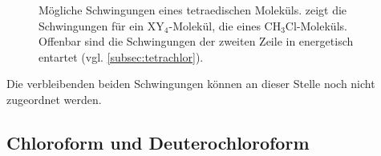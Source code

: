 \documentclass[../bericht.tex]{subfiles}
\begin{document}
\begin{figure}[p]
{            \label{fig:chcl3-schwingungen}}
          \caption[Mögliche Schwingungen eines tetraedischen Moleküls.]{Mögliche Schwingungen eines tetraedischen Moleküls. \protect{} zeigt die Schwingungen für ein $\mathrm{XY_4}$-Molekül, \protect{} die eines $\mathrm{CH_3Cl}$-Moleküls. Offenbar sind die Schwingungen der zweiten Zeile in \protect{} energetisch entartet (vgl. \cref{subsec:tetrachlor}). \cite{herzberg}}
          \label{fig:schwingungen}
        \end{figure}

        Die verbleibenden beiden Schwingungen können an dieser Stelle noch nicht zugeordnet werden.


      \subsection{Chloroform und Deuterochloroform}
      \label{subsec:chloro-deutero}
\end{document}
